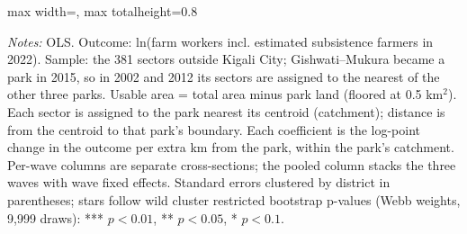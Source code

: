 \documentclass[11pt]{article}
\begin{document}
\begin{table}[H]
\begin{adjustbox}{max width=\textwidth, max totalheight=0.8\textheight}
\end{adjustbox}
\begin{minipage}{0.97\textwidth}\scriptsize
\textit{Notes:} OLS. Outcome: ln(farm workers incl. estimated subsistence farmers in 2022). Sample: the 381 sectors outside Kigali City; Gishwati--Mukura became a park in 2015, so in 2002 and 2012 its sectors are assigned to the nearest of the other three parks. Usable area = total area minus park land (floored at 0.5 km$^2$). Each sector is assigned to the park nearest its centroid (catchment); distance is from the centroid to that park's boundary. Each coefficient is the log-point change in the outcome per extra km from the park, within the park's catchment. Per-wave columns are separate cross-sections; the pooled column stacks the three waves with wave fixed effects. Standard errors clustered by district in parentheses; stars follow wild cluster restricted bootstrap p-values (Webb weights, 9,999 draws): *** $p<0.01$, ** $p<0.05$, * $p<0.1$.
\end{minipage}
\end{table}
\clearpage
\end{document}
